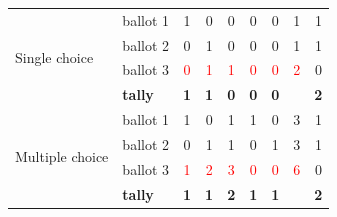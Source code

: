 \begin{table}[h]
\begin{tabular}{l l ccccc c c}
		\midrule
		\multirow{4}{*}{Single choice} & ballot 1 & 1 & 0 & 0 & 0 & 0 & 1 & 1 \\
		 & ballot 2 & 0 & 1 & 0 & 0 & 0 & 1 & 1 \\
		 & ballot 3 & \textcolor{red}{0} & \textcolor{red}{1} & \textcolor{red}{1} & \textcolor{red}{0} & \textcolor{red}{0} & \textcolor{red}{2} & 0 \\
		& \textbf{tally} & \textbf{1} & \textbf{1} & \textbf{0} & \textbf{0} & \textbf{0} & & \textbf{2} \\
		\midrule
		\multirow{4}{*}{Multiple choice} & ballot 1 & 1 & 0 & 1 & 1 & 0 & 3 & 1 \\
		 & ballot 2 & 0 & 1 & 1 & 0 & 1 & 3 & 1 \\
		 & ballot 3 & \textcolor{red}{1} & \textcolor{red}{2} & \textcolor{red}{3} & \textcolor{red}{0} & \textcolor{red}{0} & \textcolor{red}{6} & 0 \\
		& \textbf{tally} & \textbf{1} & \textbf{1} & \textbf{2} & \textbf{1} & \textbf{1} & & \textbf{2} \\
		\bottomrule
	\end{tabular}
\end{table}

